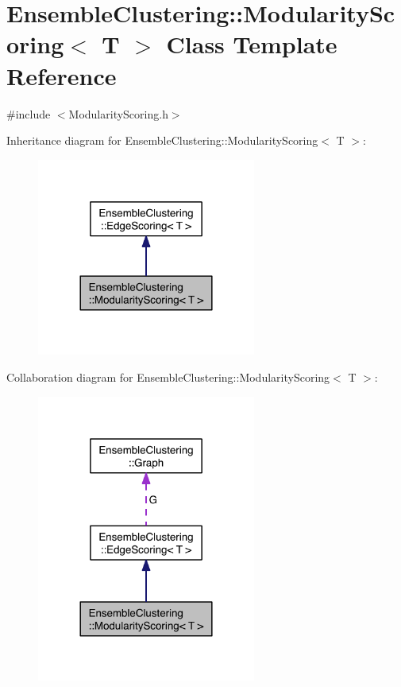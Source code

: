 \hypertarget{class_ensemble_clustering_1_1_modularity_scoring}{\section{Ensemble\-Clustering\-:\-:Modularity\-Scoring$<$ T $>$ Class Template Reference}
\label{class_ensemble_clustering_1_1_modularity_scoring}
}


{\ttfamily \#include $<$Modularity\-Scoring.\-h$>$}



Inheritance diagram for Ensemble\-Clustering\-:\-:Modularity\-Scoring$<$ T $>$\-:
\nopagebreak
\begin{figure}[H]
\begin{center}
\leavevmode
\includegraphics[width=204pt]{class_ensemble_clustering_1_1_modularity_scoring__inherit__graph}
\end{center}
\end{figure}


Collaboration diagram for Ensemble\-Clustering\-:\-:Modularity\-Scoring$<$ T $>$\-:
\nopagebreak
\begin{figure}[H]
\begin{center}
\leavevmode
\includegraphics[width=204pt]{class_ensemble_clustering_1_1_modularity_scoring__coll__graph}
\end{center}
\end{figure}
